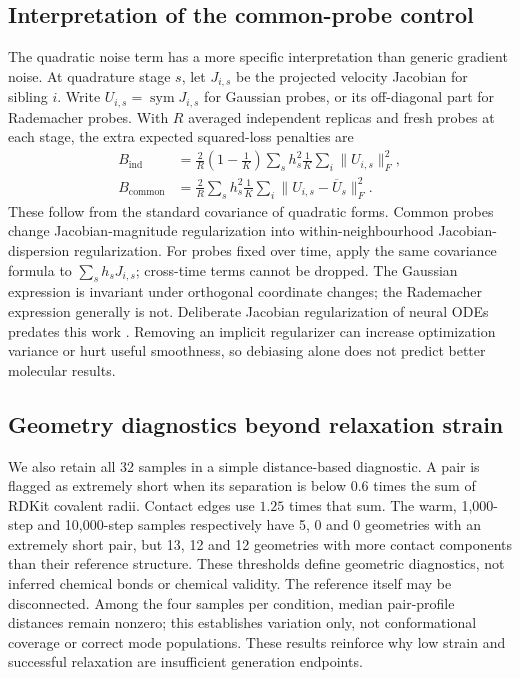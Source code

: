 \subsection{Interpretation of the common-probe control}

The quadratic noise term has a more specific interpretation than generic gradient
noise. At quadrature stage $s$, let $J_{i,s}$ be the projected velocity Jacobian for
sibling $i$. Write $U_{i,s}=\operatorname{sym}J_{i,s}$ for Gaussian probes, or its
off-diagonal part for Rademacher probes. With $R$ averaged independent replicas and
fresh probes at each stage, the extra expected squared-loss penalties are
\begin{align*}
 B_{\mathrm{ind}}&=\frac{2}{R}\left(1-\frac1K\right)
      \sum_s h_s^2\frac1K\sum_i\|U_{i,s}\|_F^2,\\
 B_{\mathrm{common}}&=\frac{2}{R}\sum_s h_s^2\frac1K
      \sum_i\|U_{i,s}-\overline U_s\|_F^2.
\end{align*}
These follow from the standard covariance of quadratic forms. Common probes change
Jacobian-magnitude regularization into within-neighbourhood Jacobian-dispersion
regularization. For probes fixed over time, apply the same covariance formula to
$\sum_s h_sJ_{i,s}$; cross-time terms cannot be dropped. The Gaussian expression is
invariant under orthogonal coordinate changes; the Rademacher expression generally
is not. Deliberate Jacobian regularization of neural ODEs predates this work
\citep{finlay2020}. Removing an implicit regularizer can increase optimization variance
or hurt useful smoothness, so debiasing alone does not predict better molecular results.

\subsection{Geometry diagnostics beyond relaxation strain}

We also retain all 32 samples in a simple distance-based diagnostic. A pair is
flagged as extremely short when its separation is below $0.6$ times the sum of
RDKit covalent radii. Contact edges use $1.25$ times that sum. The warm, 1,000-step
and 10,000-step samples respectively have 5, 0 and 0 geometries with an extremely
short pair, but 13, 12 and 12 geometries with more contact components than their
reference structure. These thresholds define geometric diagnostics, not inferred
chemical bonds or chemical validity. The reference itself may be disconnected.
Among the four samples per condition, median pair-profile distances remain
nonzero; this establishes variation only, not conformational coverage or correct
mode populations. These results reinforce why low strain and successful
relaxation are insufficient generation endpoints.
